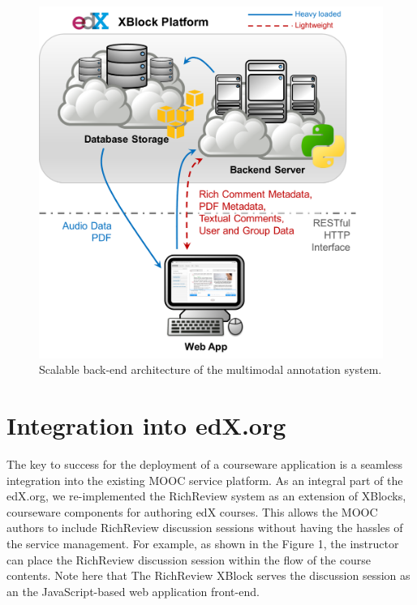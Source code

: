 \documentclass{sigchi}
\begin{document}
\begin{figure}[!h]
\centering
\includegraphics[width=0.95\columnwidth]{figure_architecture}
\caption{Scalable back-end architecture of the multimodal annotation system.}
\label{fig:figure2}
\end{figure}

\section{Integration into edX.org} 

The key to success for the deployment of a courseware application is a seamless integration into the existing MOOC service platform.
As an integral part of the edX.org, we re-implemented the RichReview system as an extension of XBlocks, courseware components for authoring edX courses.
This allows the MOOC authors to include RichReview discussion sessions without having the hassles of the service management.
For example, as shown in the Figure 1, the instructor can place the RichReview discussion session within the flow of the course contents.
Note here that The RichReview XBlock serves the discussion session as an the JavaScript-based web application front-end.
\end{document}

